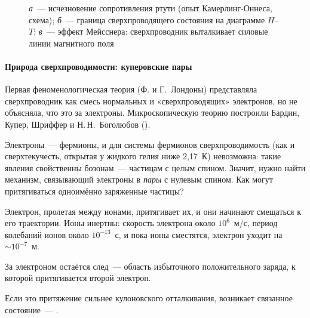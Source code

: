 \begin{figure}[ht]
\begin{subfigure}[b]{0.31\textwidth}
\caption{}
\end{subfigure}
\caption{\textit{а}~— исчезновение сопротивления ртути (опыт
Камерлинг-Оннеса, схема); \textit{б}~— граница сверхпроводящего
состояния на диаграмме $H$--$T$; \textit{в}~— эффект Мейсснера:
сверхпроводник выталкивает силовые линии магнитного поля}
\label{fig:sc-basic}
\end{figure}

\paragraph{Природа сверхпроводимости: куперовские пары}
Первая феноменологическая теория (Ф. и Г.~Лондоны) представляла
сверхпроводник как смесь нормальных и «сверхпроводящих» электронов, но
не объясняла, что это за электроны. Микроскопическую теорию построили
Бардин, Купер, Шриффер и Н.\,Н.~Боголюбов ().

Электроны~— фермионы, и для системы фермионов сверхпроводимость (как и
сверхтекучесть, открытая у жидкого гелия ниже 2,17~К) невозможна: такие
явления свойственны бозонам~— частицам с целым спином. Значит, нужно
найти механизм, связывающий электроны в \emph{пары} с нулевым спином.
Как могут притягиваться одноимённо заряженные частицы?
\begin{shagi}
\item Электрон, пролетая между ионами, притягивает их, и они начинают
смещаться к его траектории. Ионы инертны: скорость электрона около
$10^6$~м/с, период колебаний ионов около $10^{-13}$~с, и пока ионы
сместятся, электрон уходит на $\sim10^{-7}$~м.
\item За электроном остаётся след~— область избыточного положительного
заряда, к которой притягивается второй электрон.
\item Если это притяжение сильнее кулоновского отталкивания, возникает
связанное состояние~— .
\end{shagi}

